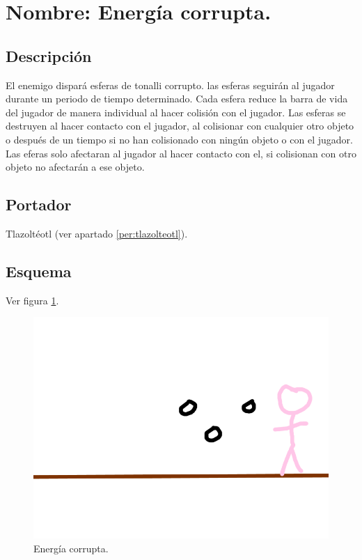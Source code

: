 \section{Nombre: Energía corrupta.} \label{hab.CorrupEner}
\subsection{Descripción}
El enemigo dispará esferas de tonalli corrupto. las esferas seguirán al jugador durante un periodo de tiempo determinado. Cada esfera reduce la barra de vida del jugador de manera individual al hacer colisión con el jugador. Las esferas se destruyen al hacer contacto con el jugador, al colisionar con cualquier otro objeto o después de un tiempo si no han colisionado con ningún objeto o con el jugador. Las eferas solo afectaran al jugador al hacer contacto con el, si colisionan con otro objeto no afectarán a ese objeto. 
\subsection{Portador}
Tlazoltéotl (ver apartado \ref{per:tlazolteotl}).
\subsection{Esquema}
			Ver figura \ref{fig:energiaC}.
			\begin{figure}
				\centering
				\includegraphics[height=0.2 \textheight]{Imagenes/energiaC}
				\caption{Energía corrupta.}
				\label{fig:energiaC}
			\end{figure}	

